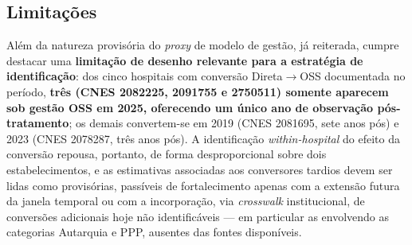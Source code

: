 \subsection*{Limitações}

Além da natureza provisória do \emph{proxy} de modelo de gestão, já reiterada, cumpre destacar uma \textbf{limitação de desenho relevante para a estratégia de identificação}: dos cinco hospitais com conversão Direta$\to$OSS documentada no período, \textbf{três (CNES 2082225, 2091755 e 2750511) somente aparecem sob gestão OSS em 2025, oferecendo um único ano de observação pós-tratamento}; os demais convertem-se em 2019 (CNES 2081695, sete anos pós) e 2023 (CNES 2078287, três anos pós). A identificação \emph{within-hospital} do efeito da conversão repousa, portanto, de forma desproporcional sobre dois estabelecimentos, e as estimativas associadas aos conversores tardios devem ser lidas como provisórias, passíveis de fortalecimento apenas com a extensão futura da janela temporal ou com a incorporação, via \emph{crosswalk} institucional, de conversões adicionais hoje não identificáveis --- em particular as envolvendo as categorias Autarquia e PPP, ausentes das fontes disponíveis.

